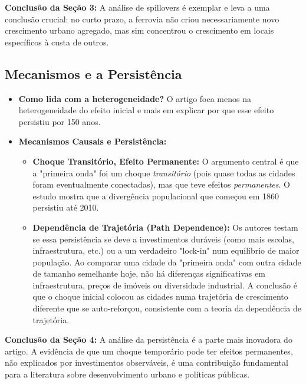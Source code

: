 \documentclass[12pt, a4paper]{article}
\begin{document}
\noindent\textbf{Conclusão da Seção 3:} A análise de spillovers é exemplar e leva a uma conclusão crucial: no curto prazo, a ferrovia não criou necessariamente novo crescimento urbano agregado, mas sim concentrou o crescimento em locais específicos à custa de outros.

\subsection{Mecanismos e a Persistência}

\begin{itemize}
    \item \textbf{Como lida com a heterogeneidade?} O artigo foca menos na heterogeneidade do efeito inicial e mais em explicar por que esse efeito persistiu por 150 anos.
    \item \textbf{Mecanismos Causais e Persistência:}
        \begin{itemize}
            \item \textbf{Choque Transitório, Efeito Permanente:} O argumento central é que a "primeira onda" foi um choque \textit{transitório} (pois quase todas as cidades foram eventualmente conectadas), mas que teve efeitos \textit{permanentes}. O estudo mostra que a divergência populacional que começou em 1860 persistiu até 2010.
            \item \textbf{Dependência de Trajetória (Path Dependence):} Os autores testam se essa persistência se deve a investimentos duráveis (como mais escolas, infraestrutura, etc.) ou a um verdadeiro "lock-in" num equilíbrio de maior população. Ao comparar uma cidade da "primeira onda" com outra cidade de tamanho semelhante hoje, não há diferenças significativas em infraestrutura, preços de imóveis ou diversidade industrial. A conclusão é que o choque inicial colocou as cidades numa trajetória de crescimento diferente que se auto-reforçou, consistente com a teoria da dependência de trajetória.
        \end{itemize}
\end{itemize}

\noindent\textbf{Conclusão da Seção 4:} A análise da persistência é a parte mais inovadora do artigo. A evidência de que um choque temporário pode ter efeitos permanentes, não explicados por investimentos observáveis, é uma contribuição fundamental para a literatura sobre desenvolvimento urbano e políticas públicas.
\end{document}
